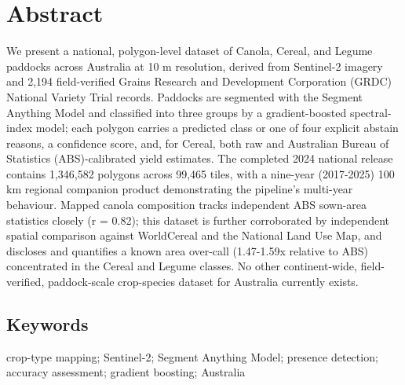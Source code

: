 
\section*{Abstract}\label{abstract}

We present a national, polygon-level dataset of Canola, Cereal, and Legume paddocks across Australia at 10 m resolution, derived from Sentinel-2 imagery and 2,194 field-verified Grains Research and Development Corporation (GRDC) National Variety Trial records. Paddocks are segmented with the Segment Anything Model and classified into three groups by a gradient-boosted spectral-index model; each polygon carries a predicted class or one of four explicit abstain reasons, a confidence score, and, for Cereal, both raw and Australian Bureau of Statistics (ABS)-calibrated yield estimates. The completed 2024 national release contains 1,346,582 polygons across 99,465 tiles, with a nine-year (2017-2025) 100 km regional companion product demonstrating the pipeline's multi-year behaviour. Mapped canola composition tracks independent ABS sown-area statistics closely (r = 0.82); this dataset is further corroborated by independent spatial comparison against WorldCereal and the National Land Use Map, and discloses and quantifies a known area over-call (1.47-1.59x relative to ABS) concentrated in the Cereal and Legume classes. No other continent-wide, field-verified, paddock-scale crop-species dataset for Australia currently exists.

\subsection*{Keywords}\label{keywords}

crop-type mapping; Sentinel-2; Segment Anything Model; presence detection; accuracy assessment; gradient boosting; Australia
